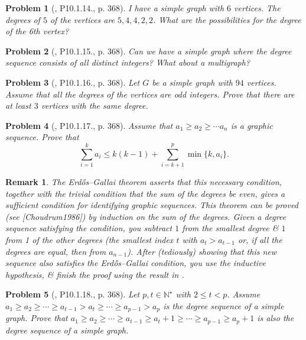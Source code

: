 \documentclass[oneside]{book}
\newtheorem{problem}{Problem}
\newtheorem{remark}{Remark}
\begin{document}
\begin{problem}[\cite{Shahriari2022}, P10.1.14., p. 368]
	I have a simple graph with $6$ vertices. The degrees of $5$ of the vertices are $5,4,4,2,2$. What are the possibilities for the degree of the 6th vertex?
\end{problem}

\begin{problem}[\cite{Shahriari2022}, P10.1.15., p. 368]
	Can we have a simple graph where the degree sequence consists of all distinct integers? What about a multigraph?
\end{problem}

\begin{problem}[\cite{Shahriari2022}, P10.1.16., p. 368]
	Let $G$ be a simple graph with $94$ vertices. Assume that all the degrees of the vertices are odd integers. Prove that there are at least $3$ vertices with the same degree.
\end{problem}

\begin{problem}[\cite{Shahriari2022}, P10.1.17., p. 368]
	Assume that $a_1\ge a_2\ge\cdots a_n$ is a graphic sequence. Prove that
	\begin{equation*}
		\sum_{i=1}^k a_i\le k(k - 1) + \sum_{i=k+1}^p \min\{k,a_i\}.
	\end{equation*}
\end{problem}

\begin{remark}
	The Erd\H{o}s--Gallai theorem asserts that this necessary condition, together with the trivial condition that the sum of the degrees be even, gives a sufficient condition for identifying graphic sequences. This theorem can be proved (see [Choudrum1986]) by induction on the sum of the degrees. Given a degree sequence satisfying the condition, you subtract $1$ from the smallest degree \& $1$ from 1 of the other degrees (the smallest index $t$ with $a_t > a_{t-1}$ or, if all the degrees are equal, then from $a_{n-1}$). After (tediously) showing that this new sequence also satisfies the Erd\H{o}s--Gallai condition, you use the inductive hypothesis, \& finish the proof using the result in \cite[Prob. P10.1.18, p. 368]{Shahriari2022}.
\end{remark}

\begin{problem}[\cite{Shahriari2022}, P10.1.18., p. 368]
	Let $p,t\in\mathbb{N}^\star$ with $2\le t < p$. Assume $a_1\ge a_2\ge\cdots\ge a_{t-1} > a_t\ge\cdots\ge a_{p-1} > a_p$ is the degree sequence of a simple graph. Prove that $a_1\ge a_2\ge\cdots\ge a_{t-1}\ge a_t + 1\ge\cdots\ge a_{p-1}\ge a_p + 1$ is also the degree sequence of a simple graph.
\end{problem}
\end{document}

